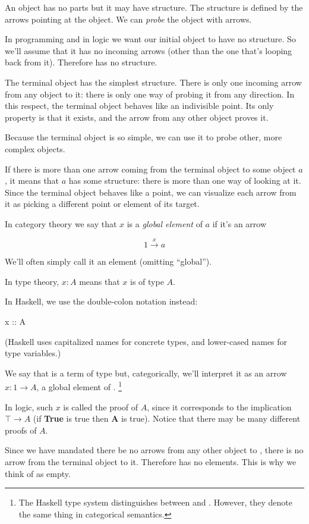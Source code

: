 \documentclass[DaoFP]{subfiles}
\begin{document}
An object has no parts but it may have structure. The structure is defined by the arrows pointing at the object. We can \emph{probe} the object with arrows.

In programming and in logic we want our initial object to have no structure. So we'll assume that it has no incoming arrows (other than the one that's looping back from it). Therefore  has no structure. 

The terminal object has the simplest structure. There is only one incoming arrow from any object to it: there is only one way of probing it from any direction. In this respect, the terminal object behaves like an indivisible point. Its only property is that it exists, and the arrow from any other object proves it. 

Because the terminal object is so simple, we can use it to probe other, more complex objects. 

If there is more than one arrow coming from the terminal object to some object $a$, it means that $a$ has some structure: there is more than one way of looking at it. Since the terminal object behaves like a point, we can visualize each arrow from it as picking a different point or element of its target. 

In category theory we say that $ x$ is a \emph{global element} of $a$ if it's an arrow

\[ 1 \xrightarrow x a \]

We'll often simply call it an element (omitting ``global'').

In type theory, $ x \colon A$ means that $x$ is of type $A$.

In Haskell, we use the double-colon notation instead:
\begin{haskell}
x :: A
\end{haskell}
(Haskell uses capitalized names for concrete types, and lower-cased names for type variables.)

We say that  is a term of type  but, categorically, we'll interpret it as an arrow $x : 1 \to A$, a global element of . \footnote{The Haskell type system distinguishes between  and . However, they denote the same thing in categorical semantics.}

In logic, such $ x$ is called the proof of $ A$, since it corresponds to the implication $ \top \to A$ (if \textbf{True} is true then \textbf{A} is true). Notice that there may be many different proofs of $A$.

Since we have mandated there be no arrows from any other object to , there is no arrow from the terminal object to it. Therefore  has no elements. This is why we think of  as empty.
\end{document}
